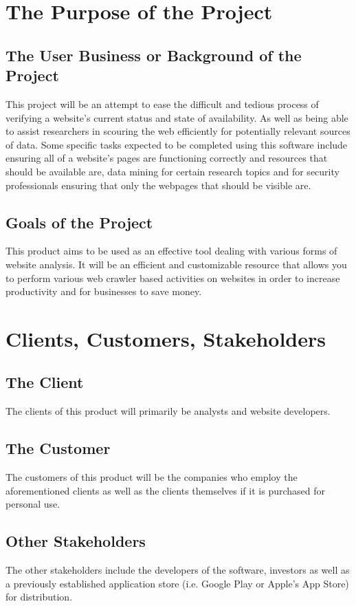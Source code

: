 \documentclass[titlepage]{article}
\begin{document}
\section{The Purpose of the Project}

\subsection*{The User Business or Background of the Project}
This project will be an attempt to ease the difficult and tedious process of verifying a website’s current status and state of availability. As well as being able to assist researchers in scouring the web efficiently for potentially relevant sources of data. Some specific tasks expected to be completed using this software include ensuring all of a website’s pages are functioning correctly and resources that should be available are, data mining for certain research topics and for security professionals ensuring that only the webpages that should be visible are.

\subsection*{Goals of the Project}
This product aims to be used as an effective tool dealing with various forms of website analysis. It will be an efficient and customizable resource that allows you to perform various web crawler based activities on websites in order to increase productivity and for businesses to save money.


\section{Clients, Customers, Stakeholders}

\subsection*{The Client}
The clients of this product will primarily be analysts and website developers.

\subsection*{The Customer}
The customers of this product will be the companies who employ the aforementioned clients as well as the clients themselves if it is purchased for personal use.

\subsection*{Other Stakeholders}
The other stakeholders include the developers of the software, investors as well as a previously established application store (i.e. Google Play or Apple’s App Store) for distribution.
\end{document}
